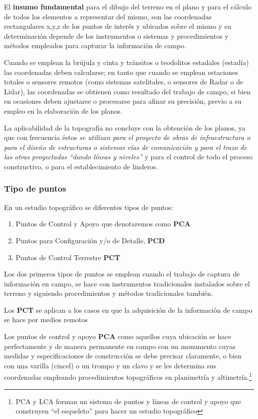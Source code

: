 El \textbf{insumo fundamental} para el dibujo del terreno en el plano y para el cálculo de todos los elementos a representar del mismo, son las coordenadas rectangulares x,y,z de los puntos de interés y ubicados sobre el mismo y su determinación depende de los instrumentos o sistemas y procedimientos y métodos empleados para capturar la información de campo.

Cuando se emplean la brújula y cinta y tránsitos o teodolitos estadales (estadía) las coordenadas deben calcularse; en tanto que cuando se emplean estaciones totales o sensores remotos (como sistemas satelitales, o sensores de Radar o de Lidar), las coordenadas se obtienen como resultado del trabajo de campo, si bien en ocasiones deben ajustarse o procesarse para afinar su precisión, previo a su empleo en la elaboración de los planos.

La aplicabilidad de la topografía no concluye con la obtención de los planos, ya que con frecuencia éstos \emph{se utilizan para el proyecto de obras de infraestructura o para el diseño de estructuras o sistemas vías de comunicación y para el trazo de las otras proyectadas ``dando líneas y niveles''}
y para el control de todo el proceso constructivo, o para el establecimiento de linderos.

\subsubsection{Tipo de puntos}
En un estudio topográfico se diferentes tipos de puntos:

\begin{enumerate}
    \item Puntos de Control y Apoyo que denotaremos como \textbf{PCA}
    \item Puntos para Configuración y/o de Detalle, \textbf{PCD}
    \item Puntos de Control Terrestre \textbf{PCT}
\end{enumerate}

Los dos primeros tipos de puntos se emplean cuando el trabajo de captura de información en campo, se hace con instrumentos tradicionales instalados sobre el terreno y siguiendo procedimientos y métodos tradicionales también.

Los \textbf{PCT} se aplican a los casos en que la adquisición de la información de campo se hace por medios remotos

Los puntos de control y apoyo \textbf{PCA} como aquellos cuya ubicación se hace perfectamente y de manera permanente en campo con un monumento cuyas medidas y especificaciones de construcción se debe precisar claramente, o bien con una varilla (cincel) o un trompo y un clavo y se les determina sus coordenadas empleando procedimientos topográficos en planimetría y altimetría.\footnote{PCA y LCA forman un sistema de puntos y líneas de control y apoyo que construyen ``el esqueleto'' para hacer un estudio topográfico}

